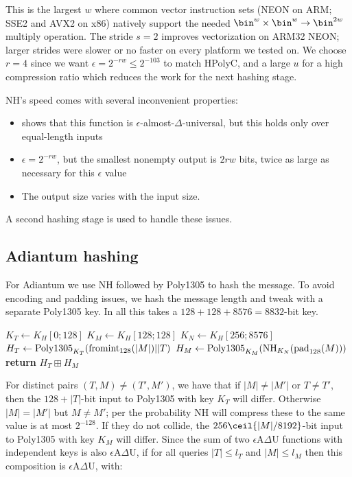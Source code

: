 \documentclass[eprint.tex]{subfiles}
\begin{document}
This is the largest $w$ where common vector instruction sets (NEON on ARM; SSE2
and AVX2 on x86) natively support the needed $\bin^w \times \bin^w \rightarrow
\bin^{2w}$ multiply operation.  The stride $s=2$ improves vectorization on
ARM32 NEON; larger strides were slower or no faster on every platform we tested
on. We choose $r=4$ since we want $\epsilon = 2^{-rw} \leq 2^{-103}$ to match
HPolyC, and a large $u$ for a high compression ratio which reduces the work for
the next hashing stage.

NH's speed comes with several inconvenient properties:
\begin{itemize}
    \item \cite{umac2} shows that this function is $\epsilon$-almost-$\Delta$-universal, but this
        holds only over equal-length inputs
    \item $\epsilon = 2^{-rw}$, but the smallest nonempty output is $2rw$ bits, twice as large
        as necessary for this $\epsilon$ value
    \item The output size varies with the input size.
\end{itemize}
A second hashing stage is used to handle these issues.

\subsection{Adiantum hashing}

For Adiantum we use NH followed by Poly1305 to hash the message.
To avoid encoding and padding issues, we hash the message length and tweak with
a separate Poly1305 key.
In all this takes a $128 + 128 + 8576 = 8832$-bit key.

\begin{algorithmic}[0]
    \State $K_T \gets K_H[0;128]$
    \State $K_M \gets K_H[128;128]$
    \State $K_N \gets K_H[256;8576]$
    \State $H_T \gets \operatorname{Poly1305}_{K_T}(\operatorname{fromint}_{128}(|M|) || T)$
    \State $H_M \gets \operatorname{Poly1305}_{K_M}(\operatorname{NH}_{K_N}(\operatorname{pad}_{128}(M)))$
    \State \textbf{return} $H_T \boxplus H_M$
    \EndProcedure
\end{algorithmic}

For distinct pairs $(T,M) \neq (T', M')$, we have that if $|M| \neq |M'|$ or $T \neq T'$,
then the $128 + |T|$-bit input to Poly1305 with key $K_T$ will differ.
Otherwise $|M| = |M'|$ but $M \neq M'$;
per \cite{umac2} the probability NH will compress these to the same value is at most
$2^{-128}$. If they do not collide, the $256\ceil{|M|/8192}$-bit input to Poly1305 with key $K_M$
will differ. Since the sum of two $\epsilon$A$\Delta$U functions with independent keys is also
$\epsilon$A$\Delta$U, if for all queries $|T| \leq l_T$ and $|M| \leq l_M$ then
this composition is  $\epsilon$A$\Delta$U, with:
\end{document}
